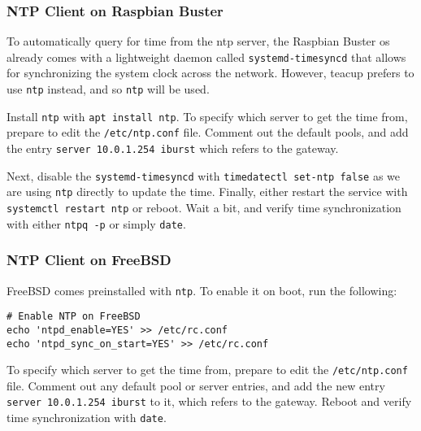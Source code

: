 \subsubsection{NTP Client on Raspbian Buster}

To automatically query for time from the \gls{ntp} server, the Raspbian Buster \gls{os} already comes with a lightweight daemon called \lstinline{systemd-timesyncd} that allows for synchronizing the system clock across the network. However, \gls{teacup} prefers to use \lstinline{ntp} instead, and so \lstinline{ntp} will be used.

Install \lstinline{ntp} with \lstinline{apt install ntp}. To specify which server to get the time from, prepare to edit the \lstinline{/etc/ntp.conf} file. Comment out the default pools, and add the entry \lstinline{server 10.0.1.254 iburst} which refers to the gateway.

Next, disable the \lstinline{systemd-timesyncd} with \lstinline{timedatectl set-ntp false} as we are using \lstinline{ntp} directly to update the time. Finally, either restart the service with \lstinline{systemctl restart ntp} or reboot. Wait a bit, and verify time synchronization with either \lstinline{ntpq -p} or simply \lstinline{date}.

\subsubsection{NTP Client on FreeBSD}

FreeBSD comes preinstalled with \lstinline{ntp}. To enable it on boot, run the following:

\begin{verbatim}
# Enable NTP on FreeBSD
echo 'ntpd_enable=YES' >> /etc/rc.conf
echo 'ntpd_sync_on_start=YES' >> /etc/rc.conf
\end{verbatim}

To specify which server to get the time from, prepare to edit the \lstinline{/etc/ntp.conf} file. Comment out any default pool or server entries, and add the new entry \lstinline{server 10.0.1.254 iburst} to it, which refers to the gateway. Reboot and verify time synchronization with \lstinline{date}.
























